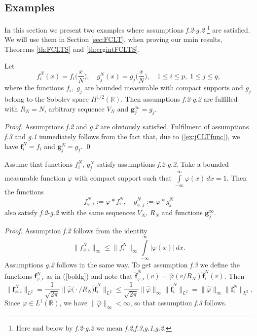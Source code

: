 \documentclass{article}
\numberwithin{equation}{section}
\newcommand{\mR}{\mathbb{R}}
\newcommand{\ph}{\varphi}
\newcommand{\fr}{\frac}
\newcommand{\qu}{\quad}
\newcommand{\ili}{\int\limits}
\newcommand{\lbl}{\label}
\newcommand{\rsec}{Section \nolinebreak}
\newcommand{\bee}{\begin{equation}}
\newcommand{\eee}{\end{equation}}
\begin{document}
\subsection{Examples}
In this section we present two examples where assumptions \emph{f.2}-\emph{g.2}
\footnote{Here and below by \emph{f.2}-\emph{g.2} we mean 
\emph{f.2},\emph{f.3},\emph{g.1},\emph{g.2}.}
are satisfied.
We will use them in \rsec\ref{sec:FCLT},
when proving our main results, Theorems \nolinebreak \ref{th:FCLTS} and \ref{th:ergintFCLTS}.
\begin{example}\lbl{ex:jCLT}
Let
\bee\lbl{ex:jCLTfunc}
f^N_i(x)=f_i\Big(\fr{x}{N}\Big), \qu g^N_j(x)=g_j\Big(\fr{x}{N}\Big), \quad
1\leq i \leq p,\; 1\leq j \leq q,
\eee
where the functions $f_i,\; g_j$ are bounded measurable with compact supports
and $g_j$ belong to the Sobolev space $H^{1/2}(\mR)$.
Then assumptions \emph{f.2}-\emph{g.2} are fulfilled
with $R_N=N$, arbitrary sequence $V_N$
and
$
\bm g^\infty_j=g_j.
$
\end{example}
{\it Proof.} Assumptions \emph{f.2} and \emph{g.2} are obviously satisfied.
Fulfilment of assumptions \emph{f.3} and \emph{g.1}  immediately follows from
the fact that, due to (\ref{ex:jCLTfunc}),
we have $\bm f^N_i=f_i$ and $\bm g^N_j=g_j$.
\qed

\begin{example}
\lbl{ex:conv}
Assume that functions
$f^N_i$, $g^N_j$
satisfy assumptions \emph{f.2}-\emph{g.2}.
Take a bounded measurable function $\ph$ with compact support
such that $\ili_{-\infty}^\infty \ph(x)\,dx = 1$.
Then the functions
$$f_{\ph,i}^N:=\ph*f^N_i, \qu g_{\ph,j}^N:=\ph*g^N_j$$
also satisfy \emph{f.2}-\emph{g.2}
with the same sequences $V_N$, $R_N$ and
functions $\bm g^\infty_j$.
\end{example}
{\it Proof.}
Assumption \emph{f.2} follows from the identity
$$
\|f_{\ph,i}^N\|_\infty \leq  \|f_i^N\|_\infty \ili_{-\infty}^\infty |\ph(x)| \,dx  .
$$
Assumptions \emph{g.2} follows in the same way.
To get assumption \emph{f.3} we define the functions $\bm f^N_{\ph,i}$
as in (\ref{boldg}) and note that
$\hat {\bm f}^N_{\ph,i}(v)=\hat\ph(v/R_N)\hat {\bm f}^N_i(v)$.
Then
$$
\|{\bm f}^N_{\ph,i}\|_{L^2}= \fr{1}{\sqrt{2\pi}}\|\hat\ph\big(\cdot/R_N\big)\hat {\bm f}^N_i\|_{L^2}
\leq \fr{1}{\sqrt{2\pi}} \|\hat\ph\|_\infty\|\hat {\bm f}^N_i\|_{L^2}
= \|\hat\ph\|_\infty\|{\bm f}^N_i\|_{L^2}.
$$
Since $\ph\in L^1(\mR)$, we have
$\|\hat\ph\|_\infty<\infty$,
so that assumption \emph{f.3} follows.
\end{document}
